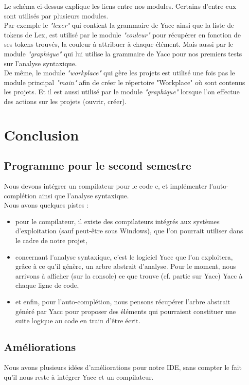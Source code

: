 \documentclass[a4paper,12pt]{article}
\begin{document}
		Le schéma ci-dessus explique les liens entre nos modules. Certains d'entre eux sont utilisés par plusieurs modules.\\
		 Par exemple le \textit{"lexer"} qui contient la grammaire de Yacc ainsi que la liste de tokens de Lex, est utilisé par le module \textit{"couleur"} pour récupérer en fonction de ses tokens trouvés, la couleur à attribuer à chaque élément. Mais aussi par le module \textit{"graphique"} qui lui utilise la grammaire de Yacc pour nos premiers tests sur l'analyse syntaxique.\\
		 De même, le module \textit{"workplace"} qui gère les projets est utilisé une fois pas le module principal \textit{"main"} afin de créer le répertoire "Workplace" où sont contenus les projets. Et il est aussi utilisé par le module \textit{"graphique"} lorsque l'on effectue des actions sur les projets (ouvrir, créer).
	
\section{Conclusion}

	\subsection{Programme pour le second semestre}
	Nous devons intégrer un compilateur pour le code c, et implémenter l'auto-complétion ainsi que l'analyse syntaxique. \\
	Nous avons quelques pistes : 
	\begin{itemize}
		\item pour le compilateur, il existe des compilateurs intégrés aux systèmes d'exploitation (sauf peut-être sous Windows), que l'on pourrait utiliser dans le cadre de notre projet,
		\item concernant l'analyse syntaxique, c'est le logiciel Yacc que l'on exploitera, grâce à ce qu'il génère, un arbre abstrait d'analyse. Pour le moment, nous arrivons à afficher (sur la console) ce que trouve (cf. partie sur Yacc) Yacc à chaque ligne de code,
		\item et enfin, pour l'auto-complétion, nous pensons récupérer l'arbre abstrait généré par Yacc pour proposer des éléments qui pourraient constituer une suite logique au code en train d'être écrit.
	\end{itemize}
	
	\subsection{Améliorations}
	Nous avons plusieurs idées d'améliorations pour notre IDE, sans compter le fait qu'il nous reste à intégrer Yacc et un compilateur. 
	
\end{document}
